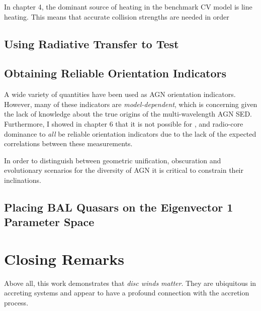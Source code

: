 In chapter 4, the dominant source of heating in the benchmark CV model
is line heating. This means that accurate collision strengths are needed
in order 

\subsection{Using Radiative Transfer to Test }

\subsection{Obtaining Reliable Orientation Indicators}

A wide variety of quantities have been used as AGN orientation
indicators. However, many of these indicators are {\em model-dependent},
which is concerning given the lack of knowledge about the true
origins of the multi-wavelength AGN SED. Furthermore, I showed in
chapter 6 that it is not possible for \ewo, \fwh and radio-core 
dominance to {\em all} be reliable orientation indicators due to
the lack of the expected correlations between these measurements.

In order to distinguish between geometric unification, obscuration 
and evolutionary scenarios for the diversity of AGN it is 
critical to constrain their inclinations.



\subsection{Placing BAL Quasars on the Eigenvector 1 Parameter Space}




\section{Closing Remarks}

Above all, this work demonstrates that {\em disc winds matter}.
They are ubiquitous in accreting systems and appear to have a 
profound connection with the accretion process. 










